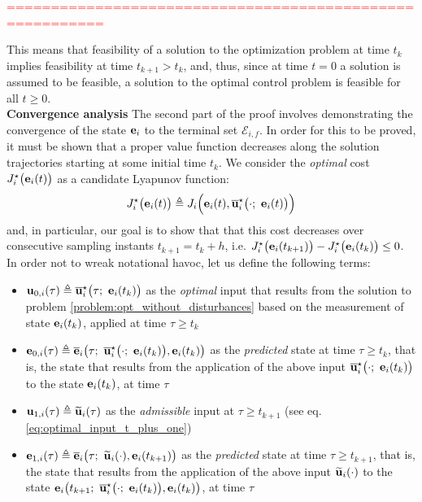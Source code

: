 \textcolor{red}{=========================================================}

This means that feasibility of a solution to the optimization problem at time
$t_k$ implies feasibility at time $t_{k+1} > t_k$, and, thus, since at time $t=0$
a solution is assumed to be feasible, a solution to the optimal control problem
is feasible for all $t \geq 0$.\\

\textbf{Convergence analysis}
The second part of the proof involves demonstrating the convergence of the
state $\bm{\mathbf{e}}_i$ to the terminal set $\mathcal{E}_{i,f}$. In order for this
to be proved, it must be shown that a proper value function decreases along
the solution trajectories starting at some initial time $t_k$. We consider the
\textit{optimal} cost $J_i^{\star}\big(\bm{\mathbf{e}}_i(t)\big)$ as a candidate
Lyapunov function:
$$J_i^{\star}\big(\vect{e}_i(t)\big) \triangleq J_i \Big(\vect{e}_i(t), \overline{\vect{u}}_i^{\star}\big(\cdot;\ \vect{e}_i(t)\big)\Big)$$
and, in particular, our goal is to show that that this cost decreases over
consecutive sampling instants $t_{k+1} = t_k + h$, i.e.
$J_i^{\star}\big(\bm{\mathbf{e}}_i(t_{k+1})\big) - J_i^{\star}\big(\bm{\mathbf{e}}_i(t_k)\big) \leq 0$.\\

In order not to wreak notational havoc, let us define the following terms:
\begin{gg_box}
\begin{itemize}
  \item $\bm{\mathbf{u}}_{0,i}(\tau) \triangleq \overline{\bm{\mathbf{u}}}_i^{\star}\big(\tau;\ \bm{\mathbf{e}}_i(t_k)\big)$
    as the \textit{optimal} input that results from the solution to problem
    \eqref{problem:opt_without_disturbances} based on the measurement of state
    $\bm{\mathbf{e}}_i(t_k)$, applied at time $\tau \geq t_k$
  \item $\vect{e}_{0,i}(\tau) \triangleq \overline{\vect{e}}_i\big(\tau;\ \overline{\vect{u}}_i^{\star}\big(\cdot;\ \vect{e}_i(t_k)\big), \vect{e}_i(t_k)\big)$
    as the \textit{predicted} state at time $\tau \geq t_k$, that is,
    the state that results from the application of the above input
    $\overline{\vect{u}}_i^{\star}\big(\cdot;\ \vect{e}_i(t_k)\big)$ to the
    state $\bm{\mathbf{e}}_i(t_k)$, at time $\tau$
  \item $\bm{\mathbf{u}}_{1,i}(\tau) \triangleq \widetilde{\bm{\mathbf{u}}}_i(\tau)$
    as the \textit{admissible} input at $\tau \geq t_{k+1}$ (see eq. \eqref{eq:optimal_input_t_plus_one})
  \item $\bm{\mathbf{e}}_{1,i}(\tau) \triangleq \overline{\bm{\mathbf{e}}}_i\big(\tau;\ \widetilde{\bm{\mathbf{u}}}_i(\cdot), \bm{\mathbf{e}}_i(t_{k+1})\big)$
    as the \textit{predicted} state at time $\tau \geq t_{k+1}$, that is,
    the state that results from the application of the above input
    $\widetilde{\bm{\mathbf{u}}}_i(\cdot)$ to the state
    $\vect{e}_i\big(t_{k+1};\ \overline{\vect{u}}_i^{\star}\big(\cdot;\ \vect{e}_i(t_k)\big), \vect{e}_i(t_k)\big)$, at time $\tau$
\end{itemize}
\end{gg_box}





